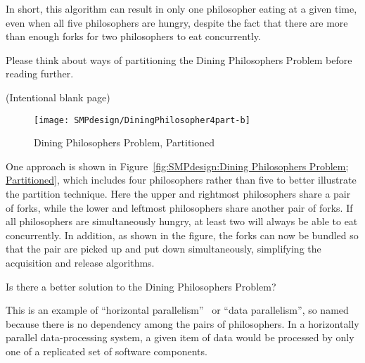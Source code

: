 In short, this algorithm can result in only one philosopher eating at
a given time, even when all five philosophers are hungry,
despite the fact that there are more than enough forks for two
philosophers to eat concurrently.

Please think about ways of partitioning the Dining Philosophers Problem
before reading further.

\clearpage
(Intentional blank page)
\clearpage

\begin{figure}[tb]
\centering
\texttt{[image: SMPdesign/DiningPhilosopher4part-b]}
\caption{Dining Philosophers Problem, Partitioned}
\end{figure}

One approach is shown in
Figure~\ref{fig:SMPdesign:Dining Philosophers Problem; Partitioned},
which includes four philosophers rather than five to better illustrate the
partition technique.
Here the upper and rightmost philosophers share a pair of forks,
while the lower and leftmost philosophers share another pair of forks.
If all philosophers are simultaneously hungry, at least two will
always be able to eat concurrently.
In addition, as shown in the figure, the forks can now be bundled
so that the pair are picked up and put down simultaneously, simplifying
the acquisition and release algorithms.

\QuickQuiz{}
	Is there a better solution to the Dining
	Philosophers Problem?
 \QuickQuizEnd

This is an example of ``horizontal parallelism''~\cite{Inman85}
or ``data parallelism'',
so named because there is no dependency among the pairs of philosophers.
In a horizontally parallel data-processing system, a given item of data
would be processed by only one of a replicated set of software
components.


